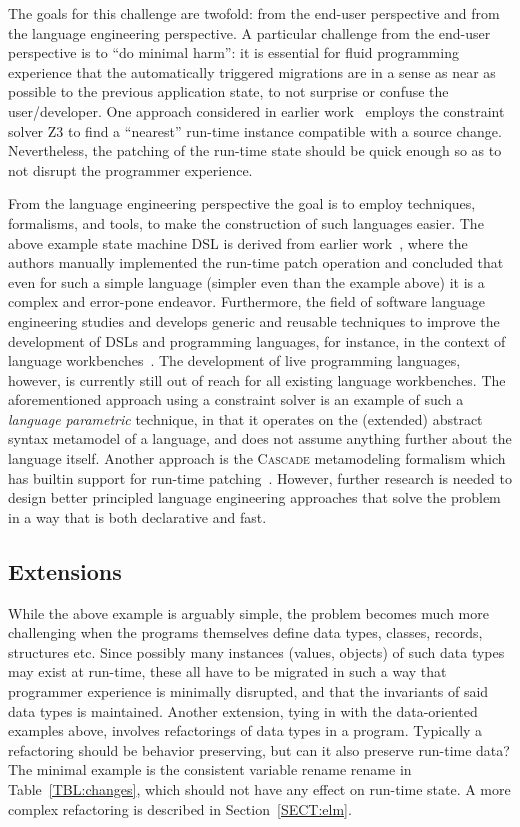 \documentclass[english,submission]{programming}
\begin{document}
The goals for this challenge are twofold: from the end-user perspective and from the language engineering perspective. A particular challenge from the end-user perspective is to ``do minimal harm'': it is essential for fluid programming experience that the automatically triggered migrations are in a sense as near as possible to the previous application state, to not surprise or confuse the user/developer.
One approach  considered in earlier work~\cite{RuntimeConstraint} employs the constraint solver Z3 to find a ``nearest'' run-time instance compatible with a source change. Nevertheless, the patching of the run-time state should be quick enough so as to not disrupt the programmer experience.

From the language engineering perspective the goal is to employ techniques, formalisms, and tools, to make the construction of such languages easier. The above example state machine DSL is derived from earlier work~\cite{vanRozen19}, where the authors manually implemented the run-time patch operation and concluded that even for such a simple language (simpler even than the example above) it is a complex and error-pone endeavor. Furthermore, the field of software language engineering studies and develops generic and reusable techniques to improve the development of DSLs and programming languages, for instance, in the context of language workbenches~\cite{ERDWEG201524}. The development of live programming languages, however, is currently still out of reach for all existing language workbenches. The aforementioned approach using a constraint solver is an example of such a \textit{language parametric} technique, in that it operates on the (extended) abstract syntax metamodel of a language, and does not assume anything further about the language itself. Another approach is the \textsc{Cascade} metamodeling formalism which has builtin support for run-time patching~\cite{Cascade}. However, further research is needed to design better principled language engineering approaches that solve the problem in a way that is both declarative and fast.

\subsection{Extensions}

While the above example is arguably simple, the problem becomes much more challenging when the programs themselves define data types, classes, records, structures etc. Since possibly many instances (values, objects) of such data types may exist at run-time, these all have to be migrated in such a way that programmer experience is minimally disrupted, and that the invariants of said data types is maintained.
Another extension, tying in with the data-oriented examples above, involves refactorings of data types in a program. Typically a refactoring should be behavior preserving, but can it also preserve run-time data? The minimal example is the consistent variable rename rename in Table~\ref{TBL:changes}, which should not have any effect on run-time state.  A more complex refactoring is described in Section~\ref{SECT:elm}.
\end{document}
